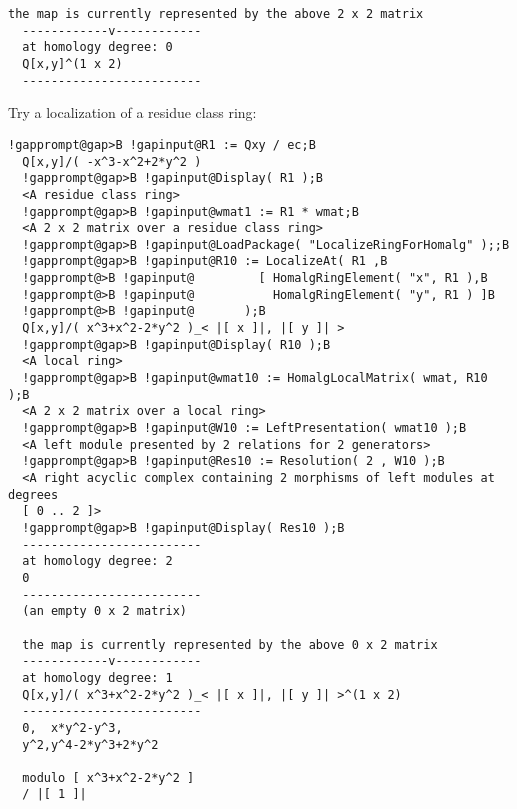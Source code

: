 \documentclass[a4paper,11pt]{report}
\begin{document}
{{\begin{Verbatim}[commandchars=!@|,fontsize=\small,frame=single,label=Example]
  the map is currently represented by the above 2 x 2 matrix
  ------------v------------
  at homology degree: 0
  Q[x,y]^(1 x 2)
  -------------------------
\end{Verbatim}
 Try a localization of a residue class ring: 
\begin{Verbatim}[commandchars=!@B,fontsize=\small,frame=single,label=Example]
  !gapprompt@gap>B !gapinput@R1 := Qxy / ec;B
  Q[x,y]/( -x^3-x^2+2*y^2 )
  !gapprompt@gap>B !gapinput@Display( R1 );B
  <A residue class ring>
  !gapprompt@gap>B !gapinput@wmat1 := R1 * wmat;B
  <A 2 x 2 matrix over a residue class ring>
  !gapprompt@gap>B !gapinput@LoadPackage( "LocalizeRingForHomalg" );;B
  !gapprompt@gap>B !gapinput@R10 := LocalizeAt( R1 ,B
  !gapprompt@>B !gapinput@         [ HomalgRingElement( "x", R1 ),B
  !gapprompt@>B !gapinput@           HomalgRingElement( "y", R1 ) ]B
  !gapprompt@>B !gapinput@       );B
  Q[x,y]/( x^3+x^2-2*y^2 )_< |[ x ]|, |[ y ]| >
  !gapprompt@gap>B !gapinput@Display( R10 );B
  <A local ring>
  !gapprompt@gap>B !gapinput@wmat10 := HomalgLocalMatrix( wmat, R10 );B
  <A 2 x 2 matrix over a local ring>
  !gapprompt@gap>B !gapinput@W10 := LeftPresentation( wmat10 );B
  <A left module presented by 2 relations for 2 generators>
  !gapprompt@gap>B !gapinput@Res10 := Resolution( 2 , W10 );B
  <A right acyclic complex containing 2 morphisms of left modules at degrees
  [ 0 .. 2 ]>
  !gapprompt@gap>B !gapinput@Display( Res10 );B
  -------------------------
  at homology degree: 2
  0
  -------------------------
  (an empty 0 x 2 matrix)
  
  the map is currently represented by the above 0 x 2 matrix
  ------------v------------
  at homology degree: 1
  Q[x,y]/( x^3+x^2-2*y^2 )_< |[ x ]|, |[ y ]| >^(1 x 2)
  -------------------------
  0,  x*y^2-y^3,
  y^2,y^4-2*y^3+2*y^2
  
  modulo [ x^3+x^2-2*y^2 ]
  / |[ 1 ]|
  

\end{Verbatim}}}
\end{document}
